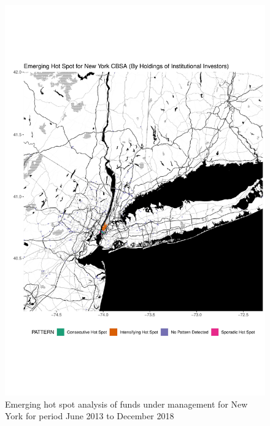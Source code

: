 \begin{figure}
	\centering
	\includegraphics[width=1\linewidth]{Figures/ChapterIV/NY_Money_EH}
	\caption[Emerging Hot Spot Analysis of Funds Under Management for New York CBSA 2013-2018]{Emerging hot spot analysis of funds under management for New York for period June 2013 to December 2018}
	\label{fig:NYCmoneyhotspot}
\end{figure}

